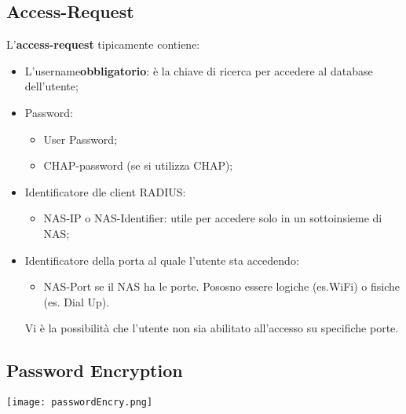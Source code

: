 \documentclass{article}
\theoremstyle{remark}
\begin{document}
\subsection{Access-Request}
L'\textbf{access-request} tipicamente contiene:\begin{itemize}
	\item L'username\textbf{obbligatorio}: è la chiave di ricerca per accedere al database dell'utente;
	\item Password:\begin{itemize}
		      \item User Password;
		      \item CHAP-password (se si utilizza CHAP);
	      \end{itemize}
	\item Identificatore dle client RADIUS:\begin{itemize}
		      \item NAS-IP o NAS-Identifier: utile per accedere solo in un sottoinsieme di NAS;
	      \end{itemize}
	\item Identificatore della porta al quale l'utente sta accedendo:\begin{itemize}
		      \item NAS-Port se il NAS ha le porte. Pososno essere logiche (es.WiFi) o fisiche (es. Dial Up).
	      \end{itemize}
	      Vi è la possibilità che l'utente non sia abilitato all'accesso su specifiche porte.
\end{itemize}
\subsection{Password Encryption}
\begin{center}
	\texttt{[image: passwordEncry.png]}
\end{center}
\end{document}
